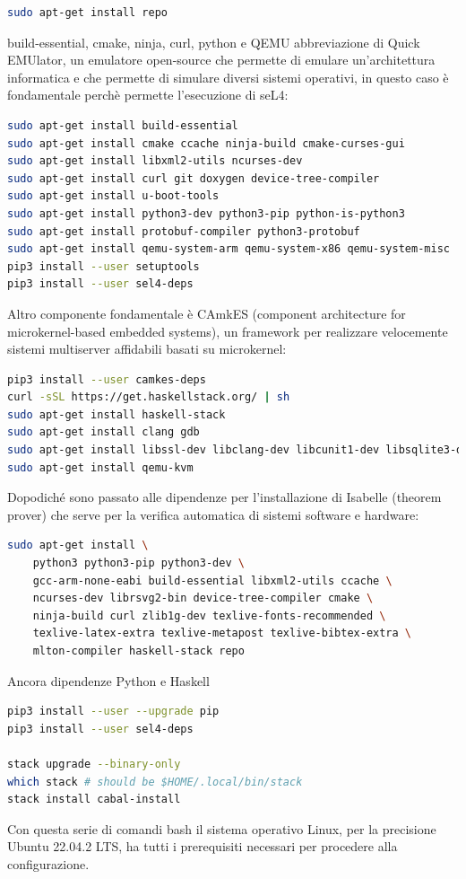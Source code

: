 \lstset{style=mystyle}

\begin{lstlisting}[language=bash]
sudo apt-get install repo
\end{lstlisting}
build-essential, cmake, ninja, curl, python e QEMU abbreviazione di Quick EMUlator, un emulatore open-source che permette di emulare un'architettura informatica e che permette di simulare diversi sistemi operativi, in questo caso è fondamentale perchè permette l'esecuzione di seL4:
\begin{lstlisting}[language=bash]
sudo apt-get install build-essential
sudo apt-get install cmake ccache ninja-build cmake-curses-gui
sudo apt-get install libxml2-utils ncurses-dev
sudo apt-get install curl git doxygen device-tree-compiler
sudo apt-get install u-boot-tools
sudo apt-get install python3-dev python3-pip python-is-python3
sudo apt-get install protobuf-compiler python3-protobuf
sudo apt-get install qemu-system-arm qemu-system-x86 qemu-system-misc
pip3 install --user setuptools
pip3 install --user sel4-deps
\end{lstlisting}
Altro componente fondamentale è CAmkES (component architecture for microkernel-based embedded systems), un framework per realizzare velocemente sistemi multiserver affidabili basati su microkernel:
\begin{lstlisting}[language=bash]
pip3 install --user camkes-deps
curl -sSL https://get.haskellstack.org/ | sh
sudo apt-get install haskell-stack
sudo apt-get install clang gdb
sudo apt-get install libssl-dev libclang-dev libcunit1-dev libsqlite3-dev
sudo apt-get install qemu-kvm
\end{lstlisting}
Dopodiché sono passato alle dipendenze per l'installazione di Isabelle (theorem prover) che serve per la verifica automatica di sistemi software e hardware:
\begin{lstlisting}[language=bash]
sudo apt-get install \
    python3 python3-pip python3-dev \
    gcc-arm-none-eabi build-essential libxml2-utils ccache \
    ncurses-dev librsvg2-bin device-tree-compiler cmake \
    ninja-build curl zlib1g-dev texlive-fonts-recommended \
    texlive-latex-extra texlive-metapost texlive-bibtex-extra \
    mlton-compiler haskell-stack repo
\end{lstlisting}
Ancora dipendenze Python e Haskell
\begin{lstlisting}[language=bash]
pip3 install --user --upgrade pip
pip3 install --user sel4-deps

stack upgrade --binary-only
which stack # should be $HOME/.local/bin/stack
stack install cabal-install
\end{lstlisting}
Con questa serie di comandi bash il sistema operativo Linux, per la precisione Ubuntu 22.04.2 LTS, ha tutti i prerequisiti necessari per procedere alla configurazione.

